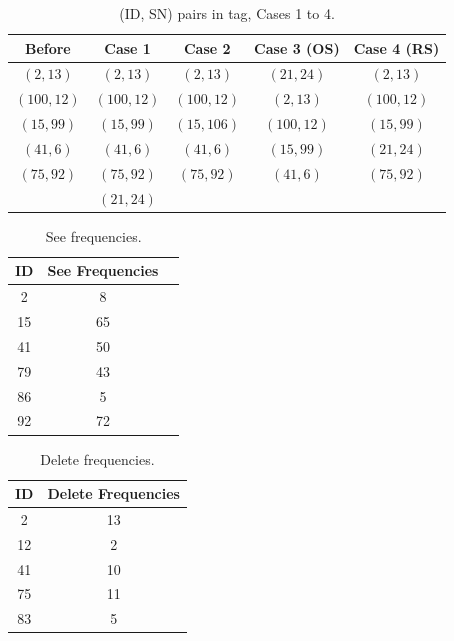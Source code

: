 \begin{table}
\caption{(ID, SN) pairs in tag, Cases 1 to 4.}
\label{Table: (ID, SN) pairs in tag, Cases 1 to 4.}
\begin{center}
\begin{tabular}{|c|c|c|c|c|}
\hline
Before & Case 1 & Case 2 & Case 3 (OS) & Case 4 (RS) \\
\hline
$(2, 13)$     & $(2, 13)$      & $(2, 13)$       & $(21, 24)$   & $(2, 13)$  \\
$(100, 12)$ & $(100, 12)$  & $(100, 12)$   & $(2, 13)$     & $(100, 12)$  \\
$(15, 99)$   & $(15, 99)$    & $(15, 106)$   & $(100, 12)$ & $(15, 99)$ \\
$(41, 6)$     & $(41, 6)$      & $(41, 6)$       & $(15, 99)$   & $(21, 24)$ \\
$(75, 92)$   & $(75, 92)$    & $(75, 92)$     & $(41, 6)$     & $(75, 92)$ \\
                   & $(21, 24)$    &             &             & \\
\hline
\end{tabular}
\end{center}
\end{table}


\begin{table}
\caption{See frequencies.}
\label{Table: See frequencies.}
\begin{center}
\begin{tabular}{|c|c|c|}
\hline
ID & See Frequencies \\
\hline
2 & 8   \\
15 & 65    \\
41 & 50  \\
79 & 43 \\
86 & 5    \\
92 & 72\\
\hline
\end{tabular}
\end{center}
\end{table}

\begin{table}
\caption{Delete frequencies.}
\label{Table: Delete frequencies.}
\begin{center}
\begin{tabular}{|c|c|}
\hline
ID & Delete Frequencies \\
\hline
2 & 13    \\
12 & 2   \\
41 & 10    \\
75 & 11    \\
83 & 5     \\
\hline
\end{tabular}
\end{center}
\end{table}

